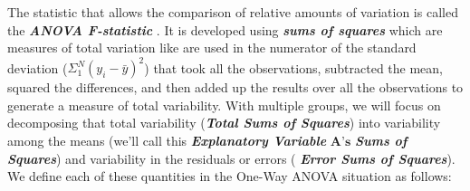 \documentclass[]{book}
\begin{document}
The statistic that allows the comparison of relative amounts of
variation is called the \textbf{\emph{ANOVA F-statistic}} . It is
developed using \textbf{\emph{sums of squares}} which are measures of
total variation like are used in the numerator of the standard deviation
(\(\Sigma_1^N(y_i-\bar{y})^2\)) that took all the observations,
subtracted the mean, squared the differences, and then added up the
results over all the observations to generate a measure of total
variability. With multiple groups, we will focus on decomposing that
total variability (\textbf{\emph{Total Sums of Squares}}) into
variability among the means (we'll call this \textbf{\emph{Explanatory
Variable}} \(\mathbf{A}\textbf{'s}\) \textbf{\emph{Sums of Squares}})
and variability in the residuals or errors ( \textbf{\emph{Error Sums of
Squares}}). We define each of these quantities in the One-Way ANOVA
situation as follows:
\end{document}
